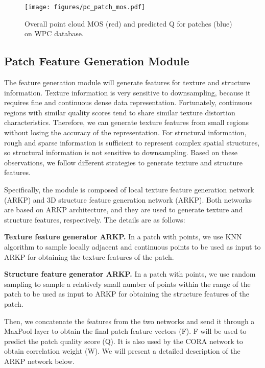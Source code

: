 \documentclass[conference]{IEEEtran}
\begin{document}
\begin{figure}[t]       \begin{center}
    \texttt{[image: figures/pc\_patch\_mos.pdf]}
\end{center}
\vspace{-0.2cm}
   \caption{Overall point cloud MOS (red) and predicted Q for patches (blue) on WPC database.}
\label{fig:pc_patch_mos}
\end{figure}



\subsection{Patch Feature Generation Module}
The feature generation module will generate features for texture and structure information. Texture information is very sensitive to downsampling, because it requires fine and continuous dense data representation. Fortunately, continuous regions with similar quality scores tend to share similar texture distortion characteristics. Therefore, we can generate texture features from small regions without losing the accuracy of the representation. For structural information, rough and sparse information is sufficient to represent complex spatial structures, so structural information is not sensitive to downsampling. Based on these observations, we follow different strategies to generate texture and structure features.

Specifically, the module is composed of local texture feature generation network (ARKP) and 3D structure feature generation network (ARKP). Both networks are based on ARKP architecture, and they are used to generate texture and structure features, respectively. The details are as follows:

\textbf{Texture feature generator ARKP.} 
In a patch with  points, we use KNN algorithm to sample locally adjacent and continuous  points to be used as input to ARKP for obtaining the texture features of the patch.

\textbf{Structure feature generator ARKP.} 
In a patch with  points, we use random sampling to sample a relatively small number of  points within the range of the patch to be used as input to ARKP for obtaining the structure features of the patch.

Then, we concatenate the features from the two networks and send it through a MaxPool layer to obtain the final patch feature vectors (F). F will be used to predict the patch quality score (Q). It is also used by the CORA network to obtain correlation weight (W). We will present a detailed description of the ARKP network below.
\end{document}
